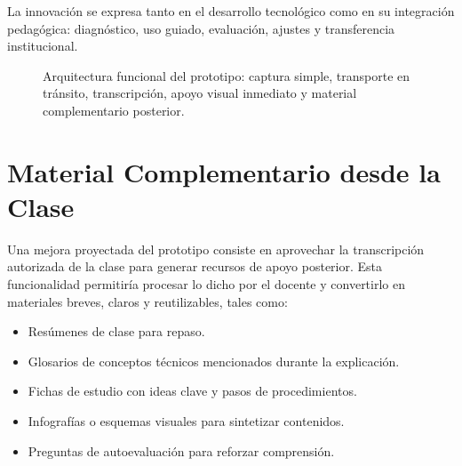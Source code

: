 \documentclass[11pt,letterpaper]{article}
\begin{document}
La innovación se expresa tanto en el desarrollo tecnológico como en su integración pedagógica: diagnóstico, uso guiado, evaluación, ajustes y transferencia institucional.

\begin{figure}[H]
\centering
{}
\caption{Arquitectura funcional del prototipo: captura simple, transporte en tránsito, transcripción, apoyo visual inmediato y material complementario posterior.}
\end{figure}

\section{Material Complementario desde la Clase}

Una mejora proyectada del prototipo consiste en aprovechar la transcripción autorizada de la clase para generar recursos de apoyo posterior. Esta funcionalidad permitiría procesar lo dicho por el docente y convertirlo en materiales breves, claros y reutilizables, tales como:

\begin{itemize}
  \item Resúmenes de clase para repaso.
  \item Glosarios de conceptos técnicos mencionados durante la explicación.
  \item Fichas de estudio con ideas clave y pasos de procedimientos.
  \item Infografías o esquemas visuales para sintetizar contenidos.
  \item Preguntas de autoevaluación para reforzar comprensión.
\end{itemize}
\end{document}

